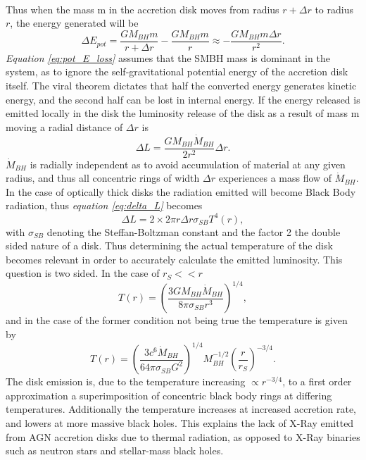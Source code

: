 \documentclass[a4paper, 12pt, twoside]{article}
\begin{document}
\\
Thus when the mass m in the accretion disk moves from radius $r+\Delta r$ to radius $r$, the energy generated will be
\begin{equation}
\Delta E_{pot} = \frac{GM_{BH}m}{r+\Delta r} - \frac{GM_{BH}m}{r} \approx -\frac{GM_{BH}m\Delta r}{r^{2}}.
\label{eq:pot_E_loss}
\end{equation}
\emph{Equation \ref{eq:pot_E_loss}} assumes that the SMBH mass is dominant in the system, as to ignore the self-gravitational potential energy of the accretion disk itself. The viral theorem dictates that half the converted energy generates kinetic energy, and the second half can be lost in internal energy. If the energy released is emitted locally in the disk the luminosity release of the disk as a result of mass m moving a radial distance of $\Delta r$ is
\begin{equation}
\Delta L = \frac{GM_{BH}\dot{M}_{BH}}{2r^{2}}\Delta r.
\label{eq:delta_L}
\end{equation}
$\dot{M}_{BH}$ is radially independent as to avoid accumulation of material at any given radius, and thus all concentric rings of width $\Delta r$ experiences a mass flow of $\dot{M}_{BH}$. In the case of optically thick disks the radiation emitted will become Black Body radiation, thus \emph{equation \ref{eq:delta_L}} becomes
\begin{equation}
\Delta L = 2\times 2\pi r\Delta r\sigma_{SB}T^{4}(r),
\label{eq:delta_L_BB}
\end{equation}
with $\sigma_{SB}$ denoting the Steffan-Boltzman constant and the factor 2 the double sided nature of a disk. Thus determining the actual temperature of the disk becomes relevant in order to accurately calculate the emitted luminosity. This question is two sided. In the case of $r_{S}<<r$
\begin{equation}
T(r) = (\frac{3GM_{BH}\dot{M}_{BH}}{8\pi\sigma_{SB}r^{3}})^{1/4},
\label{eq:T_r_s_less_r}
\end{equation}
and in the case of the former condition not being true the temperature is given by
\begin{equation}
T(r) = (\frac{3c^{6}\dot{M}_{BH}}{64\pi\sigma_{SB}G^{2}})^{1/4}M_{BH}^{-1/2}(\frac{r}{r_{S}})^{-3/4}.
\label{eq:T_r}
\end{equation}
The disk emission is, due to the temperature increasing $\propto r^{-3/4}$, to a first order approximation a superimposition of concentric black body rings at differing temperatures. Additionally the temperature increases at increased accretion rate, and lowers at more massive black holes. This explains the lack of X-Ray emitted from AGN accretion disks due to thermal radiation, as opposed to X-Ray binaries such as neutron stars and stellar-mass black holes. 	
\end{document}
